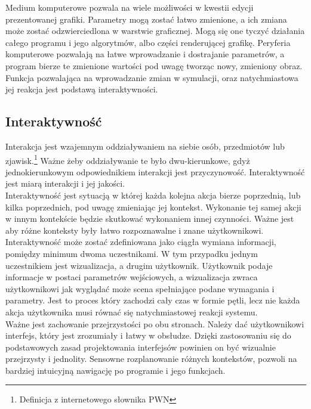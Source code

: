 \documentclass{article} %
\begin{document}
        Medium komputerowe pozwala na wiele możliwości w kwestii edycji prezentowanej grafiki. Parametry mogą zostać łatwo zmienione, a ich zmiana może zostać odzwierciedlona w warstwie graficznej. Mogą się one tyczyć działania całego programu i jego algorytmów, albo części renderującej grafikę. Peryferia komputerowe pozwalają na łatwe wprowadzanie i dostrajanie parametrów, a program bierze te zmienione wartości pod uwagę tworząc nowy, zmieniony obraz. Funkcja pozwalająca na wprowadzanie zmian w symulacji, oraz natychmiastowa jej reakcja jest podstawą interaktywności.
        \\
            
    \subsection{Interaktywność}
        Interakcja jest wzajemnym oddziaływaniem na siebie osób, przedmiotów lub zjawisk.\footnote[1]{Definicja z internetowego słownika PWN} Ważne żeby oddziaływanie te było dwu-kierunkowe, gdyż jednokierunkowym odpowiednikiem interakcji jest przyczynowość. Interaktywność jest miarą interakcji i jej jakości. 
        \\
    
        Interaktywność jest sytuacją w której każda kolejna akcja bierze poprzednią, lub kilka poprzednich, pod uwagę zmieniając jej kontekst. Wykonanie tej samej akcji w innym kontekście będzie skutkować wykonaniem innej czynności. Ważne jest aby różne konteksty były łatwo rozpoznawalne i znane użytkownikowi.
        \\
    
        Interaktywność może zostać zdefiniowana jako ciągła wymiana informacji, pomiędzy minimum dwoma uczestnikami.  W tym przypadku jednym uczestnikiem jest wizualizacja, a drugim użytkownik. Użytkownik podaje informacje w postaci parametrów wejściowych, a wizualizacja zwraca użytkownikowi jak wyglądać może scena spełniające podane wymagania i parametry. Jest to proces który zachodzi cały czas w formie pętli, lecz nie każda akcja użytkownika musi równać się natychmiastowej reakcji systemu.
        \\
        
        Ważne jest zachowanie przejrzystości po obu stronach. Należy dać użytkownikowi interfejs, który jest zrozumiały i łatwy w obsłudze. Dzięki zastosowaniu się do podstawowych zasad projektowania interfejsów powinien on być wizualnie przejrzysty i jednolity. Sensowne rozplanowanie różnych kontekstów, pozwoli na bardziej intuicyjną nawigację po programie i jego funkcjach.
        \\
    
\end{document}
